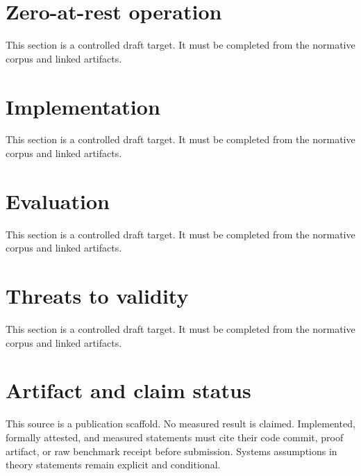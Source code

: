 \documentclass[11pt]{article}
\begin{document}
\section{Zero-at-rest operation}
This section is a controlled draft target. It must be completed from the normative corpus and linked artifacts.

\section{Implementation}
This section is a controlled draft target. It must be completed from the normative corpus and linked artifacts.

\section{Evaluation}
This section is a controlled draft target. It must be completed from the normative corpus and linked artifacts.

\section{Threats to validity}
This section is a controlled draft target. It must be completed from the normative corpus and linked artifacts.

\section*{Artifact and claim status}
This source is a publication scaffold. No measured result is claimed. Implemented,
formally attested, and measured statements must cite their code commit, proof
artifact, or raw benchmark receipt before submission. Systems assumptions in
theory statements remain explicit and conditional.
\end{document}
